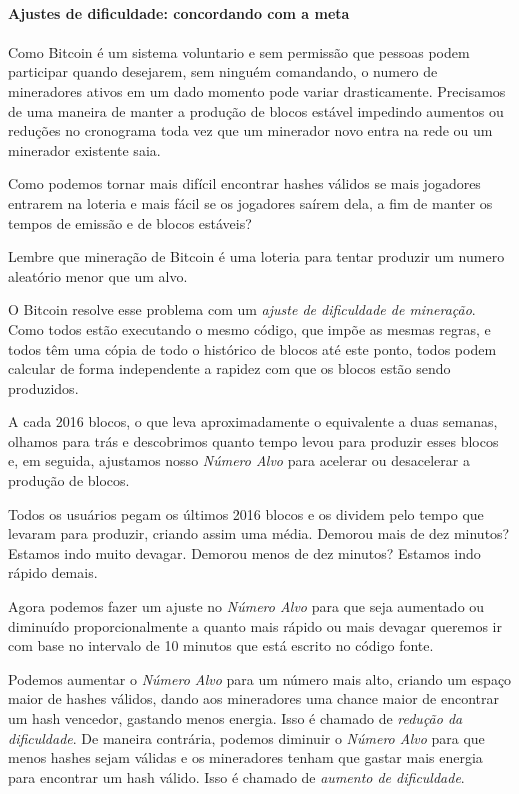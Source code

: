 \paragraph{Ajustes de dificuldade: concordando com a meta}
\paragraph{}
Como Bitcoin é um sistema voluntario e sem permissão que pessoas podem participar quando desejarem, sem ninguém comandando, o numero de mineradores ativos em um dado momento pode variar drasticamente. Precisamos de uma maneira de manter a produção de blocos estável impedindo aumentos ou reduções no cronograma toda vez que um minerador novo entra na rede ou um minerador existente saia.

Como podemos tornar mais difícil encontrar hashes válidos se mais jogadores entrarem na loteria e mais fácil se os jogadores saírem dela, a fim de manter os tempos de emissão e de blocos estáveis?

Lembre que mineração de Bitcoin é uma loteria para tentar produzir um numero aleatório menor que um alvo.

O Bitcoin resolve esse problema com um \textit{ajuste de dificuldade de mineração}. Como todos estão executando o mesmo código, que impõe as mesmas regras, e todos têm uma cópia de todo o histórico de blocos até este ponto, todos podem calcular de forma independente a rapidez com que os blocos estão sendo produzidos.

A cada 2016 blocos, o que leva aproximadamente o equivalente a duas semanas, olhamos para trás e descobrimos quanto tempo levou para produzir esses blocos e, em seguida, ajustamos nosso \textit{Número Alvo} para acelerar ou desacelerar a produção de blocos.

Todos os usuários pegam os últimos 2016 blocos e os dividem pelo tempo que levaram para produzir, criando assim uma média. Demorou mais de dez minutos? Estamos indo muito devagar. Demorou menos de dez minutos? Estamos indo rápido demais.

Agora podemos fazer um ajuste no \textit{Número Alvo} para que seja aumentado ou diminuído proporcionalmente a quanto mais rápido ou mais devagar queremos ir com base no intervalo de 10 minutos que está escrito no código fonte.

Podemos aumentar o \textit{Número Alvo} para um número mais alto, criando um espaço maior de hashes válidos, dando aos mineradores uma chance maior de encontrar um hash vencedor, gastando menos energia. Isso é chamado de \textit{redução da dificuldade}. De maneira contrária, podemos diminuir o \textit{Número Alvo} para que menos hashes sejam válidas e os mineradores tenham que gastar mais energia para encontrar um hash válido. Isso é chamado de \textit{aumento de dificuldade}.

